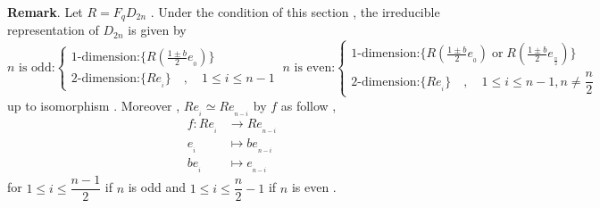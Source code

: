 \documentclass{article}
\begin{document}
\textbf{Remark}. Let $R=F_qD_{2n}$ . Under the condition of this section , the irreducible representation of $D_{2n}$ is given by
\[
\text{$n$ is odd:} \begin{cases}
  \text{1-dimension:}\{R(\frac{1\pm b}{2}e_{_0})\} \\
  \text{2-dimension:}\{Re_{_i}\}\quad,\quad1\leq i\leq n-1
\end{cases} \:
\text{$n$ is even:} \begin{cases}
  \text{1-dimension:}\{R(\frac{1\pm b}{2}e_{_0})\;\text{or}\;R(\frac{1\pm b}{2}e_{_{\frac{n}{2}}})\} \\
  \text{2-dimension:}\{Re_{_i}\}\quad,\quad1\leq i\leq n-1,n\neq\dfrac{n}{2}
\end{cases}
\]
up to isomorphism . Moreover , $Re_{_i}\simeq Re_{_{n-i}}$ by $f$ as follow ,
    \begin{align*}
        f:Re_{_i}&\longrightarrow Re_{_{n-i}}\\
        e_{_i}&\longmapsto be_{_{n-i}}\\
        be_{_i}&\longmapsto e_{_{n-i}}
    \end{align*}
for $1\leq i\leq\dfrac{n-1}{2}$ if $n$ is odd  and $1\leq i\leq\dfrac{n}{2}-1$ if $n$ is even .
\end{document}
